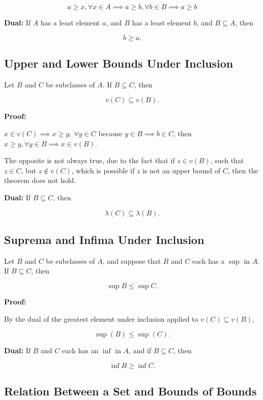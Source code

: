 \[
	a \ge x, \forall x \in A \implies a \ge b, \forall b \in B \implies a \ge b
\]

\QED

\textbf{Dual:} If \(A\) has a least element \(a\), and \(B\) has a least element \(b\), and \(B \subseteq A\), then

\[
	b \ge a.
\]

\subsection{Upper and Lower Bounds Under Inclusion}

Let \(B\) and \(C\) be subclasses of \(A\). If \(B \subseteq C\), then

\[
	v(C) \subseteq v(B).
\]

\textbf{Proof:}

\(x \in v(C) \implies x \geq y, \ \forall y \in C\) because \(y \in B \implies b \in C\), then \( x \geq y, \forall y \in B \implies x \in v(B).\)

The opposite is not always true, due to the fact that if \(z \in v(B)\), such that \(z \in C\), but \(z \notin v(C)\), which
is possible if \(z\) is not an upper bound of \(C\), then the theorem does not hold.

\QED

\textbf{Dual:} If \(B \subseteq C\), then

\[
	\lambda(C) \subseteq \lambda(B).
\]

\subsection{Suprema and Infima Under Inclusion}

Let \(B\) and \(C\) be subclasses of \(A\), and suppose that \(B\) and \(C\) each has a \(\sup\) in \(A\). If \(B \subseteq C\), then

\[
	\sup B \leq \sup C.
\]

\textbf{Proof:}

By the dual of the greatest element under inclusion applied to \(v(C) \subseteq v(B)\),

\[
	\sup(B) \le \sup(C).
\]

\QED

\textbf{Dual:} If \(B\) and \(C\) each has an \(\inf\) in \(A\), and if \(B \subseteq C\), then

\[
	\inf B \geq \inf C.
\]

\subsection{Relation Between a Set and Bounds of Bounds}

